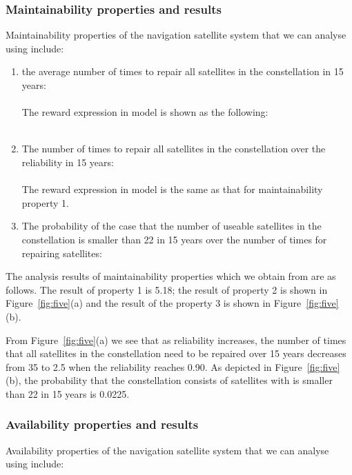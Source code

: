 \documentclass[preprint,12pt]{qrei}
\begin{document}
\subsubsection{Maintainability properties and results}

Maintainability properties of the navigation satellite system that we can analyse using  include:

\begin{enumerate}
\item the average number of times to repair all satellites in the constellation in 15 years:\\
\\
The reward expression in  model is shown as the following:
\\
\\

\item The number of times to repair all satellites in the constellation over the reliability in 15 years:\\
\\
The reward expression in  model is the same as that for maintainability property 1.
\item The probability of the case that the number of useable satellites in the constellation is smaller than 22 in 15 years over the number of times for repairing satellites:\\

\end{enumerate}

The analysis results of maintainability properties which we obtain from  are as follows. The result of property 1 is 5.18; the result of property 2 is shown in Figure~\ref{fig:five}(a) and 
the result of the property 3 is shown in Figure~\ref{fig:five}(b).

From Figure~\ref{fig:five}(a) we see that as reliability increases, the number of times that all satellites in the constellation need to be repaired over 15 years decreases from 35 to 2.5 when the reliability reaches 0.90. As depicted in Figure~\ref{fig:five}(b), the probability that the constellation consists of  satellites with  is smaller than 22 in 15 years is 0.0225.


\subsubsection{Availability properties and results}

Availability properties of the navigation satellite system that we can analyse using  include:
\end{document}
